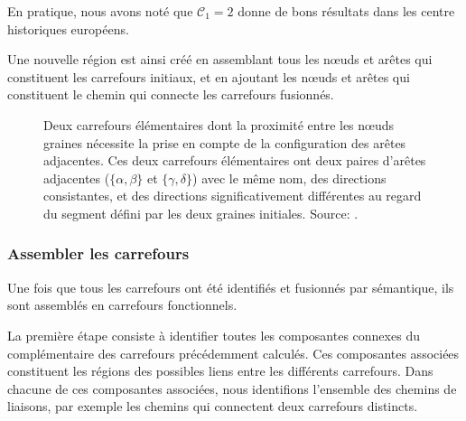 \newpar{}

En pratique, nous avons noté que $\mathcal{C}_1=2$  donne de bons résultats dans les centre historiques européens.

\newpar{}

Une nouvelle région est ainsi créé en assemblant tous les nœuds et arêtes qui constituent les carrefours initiaux, et en ajoutant les nœuds et arêtes qui constituent le chemin qui connecte les carrefours fusionnés.

\begin{figure}[ht]
    \centering
    \caption[Assemblage de deux carrefours élémentaires]{
        Deux carrefours élémentaires dont la proximité entre les nœuds graines nécessite la prise en compte de la configuration des arêtes adjacentes. Ces deux carrefours élémentaires ont deux paires d'arêtes adjacentes ($\{\alpha, \beta\}$ et $\{\gamma, \delta\}$) avec le même nom, des directions consistantes, et des directions significativement différentes au regard du segment défini par les deux graines initiales. Source: \citep{Favreau2022}.}
    \label{fig:modelisation_elementary_edges_relative_angle}
\end{figure}

\subsubsection{Assembler les carrefours}

Une fois que tous les carrefours ont été identifiés et fusionnés par sémantique, ils sont assemblés en carrefours fonctionnels.

\newpar{}

La première étape consiste à identifier toutes les composantes connexes du complémentaire des carrefours précédemment calculés. Ces composantes associées constituent les régions des possibles liens entre les différents carrefours. Dans chacune de ces composantes associées, nous identifions l'ensemble des chemins de liaisons, par exemple les chemins qui connectent deux carrefours distincts.

